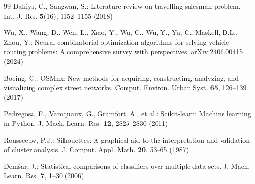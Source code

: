 {\begin{thebibliography}{99}
Dahiya, C., Sangwan, S.: Literature review on travelling salesman problem. Int. J. Res. \textbf{5}(16), 1152--1155 (2018)

Wu, X., Wang, D., Wen, L., Xiao, Y., Wu, C., Wu, Y., Yu, C., Maskell, D.L., Zhou, Y.: Neural combinatorial optimization algorithms for solving vehicle routing problems: A comprehensive survey with perspectives. arXiv:2406.00415 (2024)

Boeing, G.: OSMnx: New methods for acquiring, constructing, analyzing, and visualizing complex street networks. Comput. Environ. Urban Syst. \textbf{65}, 126--139 (2017)

Pedregosa, F., Varoquaux, G., Gramfort, A., et al.: Scikit-learn: Machine learning in Python. J. Mach. Learn. Res. \textbf{12}, 2825--2830 (2011)

Rousseeuw, P.J.: Silhouettes: A graphical aid to the interpretation and validation of cluster analysis. J. Comput. Appl. Math. \textbf{20}, 53--65 (1987)

Demšar, J.: Statistical comparisons of classifiers over multiple data sets. J. Mach. Learn. Res. \textbf{7}, 1--30 (2006)

\end{thebibliography}
}
